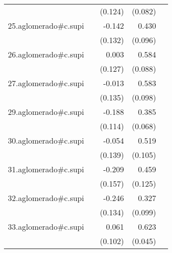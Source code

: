 {\begin{longtable}{l*{4}{D{.}{.}{-1}}}
            &                     &     (0.124)         &     (0.082)         &                     \\
\addlinespace
25.aglomerado#c.supi&                     &      -0.142         &       0.430\sym{***}&                     \\
            &                     &     (0.132)         &     (0.096)         &                     \\
\addlinespace
26.aglomerado#c.supi&                     &       0.003         &       0.584\sym{***}&                     \\
            &                     &     (0.127)         &     (0.088)         &                     \\
\addlinespace
27.aglomerado#c.supi&                     &      -0.013         &       0.583\sym{***}&                     \\
            &                     &     (0.135)         &     (0.098)         &                     \\
\addlinespace
29.aglomerado#c.supi&                     &      -0.188         &       0.385\sym{***}&                     \\
            &                     &     (0.114)         &     (0.068)         &                     \\
\addlinespace
30.aglomerado#c.supi&                     &      -0.054         &       0.519\sym{***}&                     \\
            &                     &     (0.139)         &     (0.105)         &                     \\
\addlinespace
31.aglomerado#c.supi&                     &      -0.209         &       0.459\sym{***}&                     \\
            &                     &     (0.157)         &     (0.125)         &                     \\
\addlinespace
32.aglomerado#c.supi&                     &      -0.246         &       0.327\sym{***}&                     \\
            &                     &     (0.134)         &     (0.099)         &                     \\
\addlinespace
33.aglomerado#c.supi&                     &       0.061         &       0.623\sym{***}&                     \\
            &                     &     (0.102)         &     (0.045)         &                     \\

\end{longtable}}
